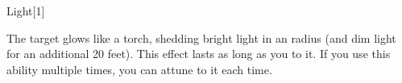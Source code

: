 \begin{spellsection}{Light}[1]

\begin{spellcontent}

\begin{spelltargetinginfo}



\end{spelltargetinginfo}


\begin{spelleffects}



\spelleffect
The target glows like a torch, shedding bright light in an \areamed radius (and dim light for an additional 20 feet).
This effect lasts as long as you  to it.
If you use this ability multiple times, you can attune to it each time.








\end{spelleffects}

\end{spellcontent}
\begin{spellfooter}


\end{spellfooter}
\begin{spellsubcontent}


\end{spellsubcontent}
\end{spellsection}



